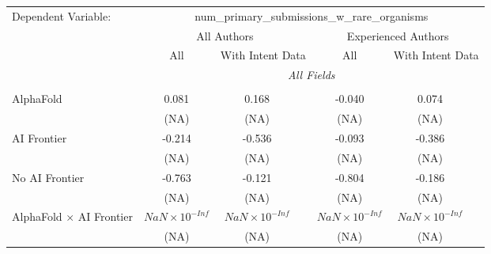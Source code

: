 \begingroup
\centering
\begin{tabular}{lcccccc}
   \tabularnewline \midrule \midrule
   Dependent Variable: & \multicolumn{6}{c}{num\_primary\_submissions\_w\_rare\_organisms}\\
 & \multicolumn{3}{c}{All Authors} & \multicolumn{3}{c}{Experienced Authors} \\
\cmidrule(lr){2-4} \cmidrule(lr){5-7}
 & \multicolumn{1}{c}{All} & \multicolumn{2}{c}{With Intent Data} & \multicolumn{1}{c}{All} & \multicolumn{2}{c}{With Intent Data} \\
\cmidrule(lr){2-2} \cmidrule(lr){3-4} \cmidrule(lr){5-5} \cmidrule(lr){6-7}
 & \multicolumn{6}{c}{\textit{All Fields}} \\ \\
   AlphaFold                                                                  & 0.081                  & 0.168                  &                        & -0.040                 & 0.074                  &   \\   
                                                                              & (NA)                   & (NA)                   &                        & (NA)                   & (NA)                   &   \\   
   AI Frontier                                                                & -0.214                 & -0.536                 &                        & -0.093                 & -0.386                 &   \\   
                                                                              & (NA)                   & (NA)                   &                        & (NA)                   & (NA)                   &   \\   
   No AI Frontier                                                             & -0.763                 & -0.121                 &                        & -0.804                 & -0.186                 &   \\   
                                                                              & (NA)                   & (NA)                   &                        & (NA)                   & (NA)                   &   \\   
   AlphaFold $\times$ AI Frontier                                             & $NaN\times 10^{-Inf}$  & $NaN\times 10^{-Inf}$  &                        & $NaN\times 10^{-Inf}$  & $NaN\times 10^{-Inf}$  &   \\   
                                                                              & (NA)                   & (NA)                   &                        & (NA)                   & (NA)                   &   \\   

\end{tabular}
